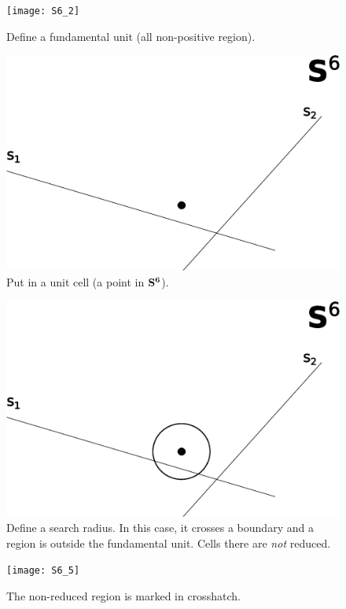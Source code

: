\documentclass[preprint]{iucr}              %
\numberwithin{equation}{section}
\newcommand{\SVI}[0]{$\bf{S^{6}}$}
\begin{document}
\begin{figure}

\texttt{[image: S6\_2]}
\caption{Define a fundamental unit (all non-positive region).}
\label{S6_2}
\end{figure}

\begin{figure}
\includegraphics[height=0.6\textwidth]{S6_3}
\caption{Put in a unit cell (a point in \SVI{}).}
\label{S6_3}
\end{figure}


\begin{figure}
\includegraphics[height=0.6\textwidth]{S6_4}
\caption{Define a search radius. In this case, it
	crosses a boundary and a region is outside the
	fundamental unit. Cells there are \textit{not} reduced.}
\label{S6_4}
\end{figure}


\begin{figure}
\texttt{[image: S6\_5]}
\caption{The non-reduced region is marked in crosshatch.}
\label{S6_5}
\end{figure}
\end{document}

